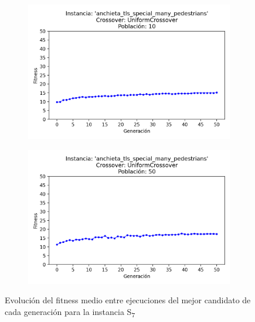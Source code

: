 \begin{figure}[h]
\begin{subfigure}[t]{.49\textwidth}
    \end{subfigure}
    \vspace{0.7cm}
    \begin{subfigure}[t]{.49\textwidth}
      \centering
      \includegraphics[width=\textwidth]{report/images/estudio/anchieta_tls_special_many_pedestrians-UniformCrossover-10.png}
    \end{subfigure}
    \hfill
    \begin{subfigure}[t]{.49\textwidth}
      \centering
      \includegraphics[width=\textwidth]{report/images/estudio/anchieta_tls_special_many_pedestrians-UniformCrossover-50.png}
    \end{subfigure}
    \caption{Evolución del fitness medio entre ejecuciones del mejor candidato de cada generación para la instancia S\textsubscript{7}}
    \label{fig:estudio:anchieta_tls_special_many_pedestrians}
\end{figure}


